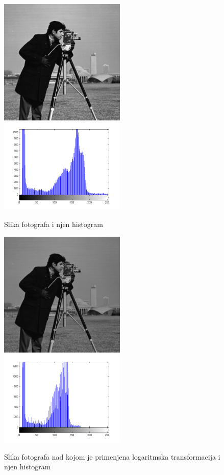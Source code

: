 \documentclass[a4paper,12pt,titlepage]{article}
\begin{document}
\begin{figure}[ht!]
\centering
\includegraphics[width=60mm]{img/img.png}
\includegraphics[width=60mm]{img/histImg.png}
\caption{Slika fotografa i njen histogram}
\label{overflow}
\end{figure} 

\begin{figure}[ht!]
\centering
\includegraphics[width=60mm]{img/imgLog.png}
\includegraphics[width=60mm]{img/histImgLog.png}
\caption{Slika fotografa nad kojom je primenjena logaritmska transformacija i njen histogram}
\label{overflow}
\end{figure} 
\end{document}
